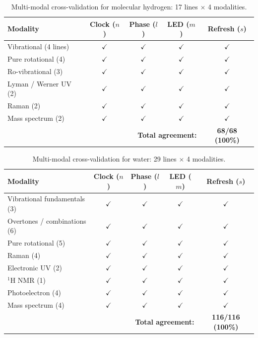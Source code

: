 \documentclass[11pt,a4paper]{article}
\theoremstyle{stmtstyle}
\theoremstyle{definition}
\theoremstyle{remark}
\begin{document}
\begin{table}[H]
\centering
\caption{Multi-modal cross-validation for molecular hydrogen: 17 lines $\times$ 4 modalities.}
\label{tab:cross_validation_h2}
\small
\begin{tabular}{lcccc}
\toprule
Modality & Clock ($n$) & Phase ($l$) & LED ($m$) & Refresh ($s$)\\
\midrule
Vibrational (4 lines)         & $\checkmark$ & $\checkmark$ & $\checkmark$ & $\checkmark$\\
Pure rotational (4)            & $\checkmark$ & $\checkmark$ & $\checkmark$ & $\checkmark$\\
Ro-vibrational (3)             & $\checkmark$ & $\checkmark$ & $\checkmark$ & $\checkmark$\\
Lyman / Werner UV (2)          & $\checkmark$ & $\checkmark$ & $\checkmark$ & $\checkmark$\\
Raman (2)                      & $\checkmark$ & $\checkmark$ & $\checkmark$ & $\checkmark$\\
Mass spectrum (2)              & $\checkmark$ & $\checkmark$ & $\checkmark$ & $\checkmark$\\
\midrule
\multicolumn{4}{r}{\textbf{Total agreement:}} & \textbf{68/68 (100\%)}\\
\bottomrule
\end{tabular}
\end{table}

\begin{table}[H]
\centering
\caption{Multi-modal cross-validation for water: 29 lines $\times$ 4 modalities.}
\label{tab:cross_validation_h2o}
\small
\begin{tabular}{lcccc}
\toprule
Modality & Clock ($n$) & Phase ($l$) & LED ($m$) & Refresh ($s$)\\
\midrule
Vibrational fundamentals (3)   & $\checkmark$ & $\checkmark$ & $\checkmark$ & $\checkmark$\\
Overtones / combinations (6)   & $\checkmark$ & $\checkmark$ & $\checkmark$ & $\checkmark$\\
Pure rotational (5)             & $\checkmark$ & $\checkmark$ & $\checkmark$ & $\checkmark$\\
Raman (4)                       & $\checkmark$ & $\checkmark$ & $\checkmark$ & $\checkmark$\\
Electronic UV (2)               & $\checkmark$ & $\checkmark$ & $\checkmark$ & $\checkmark$\\
$^{1}$H NMR (1)                 & $\checkmark$ & $\checkmark$ & $\checkmark$ & $\checkmark$\\
Photoelectron (4)               & $\checkmark$ & $\checkmark$ & $\checkmark$ & $\checkmark$\\
Mass spectrum (4)               & $\checkmark$ & $\checkmark$ & $\checkmark$ & $\checkmark$\\
\midrule
\multicolumn{4}{r}{\textbf{Total agreement:}} & \textbf{116/116 (100\%)}\\
\bottomrule
\end{tabular}
\end{table}
\end{document}
